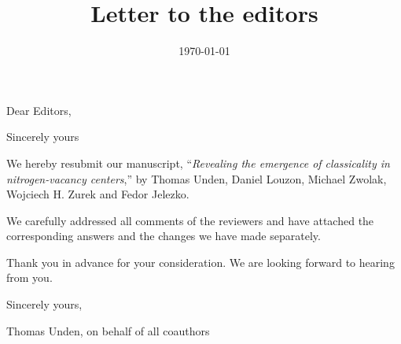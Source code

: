 \documentclass[10pt,a4paper,roman]{moderncv}        %
\title{Letter to the editors}                               %
\begin{document}
\date{\today}
\opening{Dear Editors,}
\closing{Sincerely yours}

\makelettertitle

\justify
We hereby resubmit our manuscript, ``\emph{Revealing the emergence of classicality in nitrogen-vacancy centers},'' by Thomas Unden, Daniel Louzon, Michael Zwolak, Wojciech H. Zurek and Fedor Jelezko.

We carefully addressed all comments of the reviewers and have attached the corresponding answers and the changes we have made separately.


Thank you in advance for your consideration. We are looking forward to hearing from you.  
\bigskip

Sincerely yours,\bigskip

Thomas Unden, on behalf of all coauthors
\end{document}
